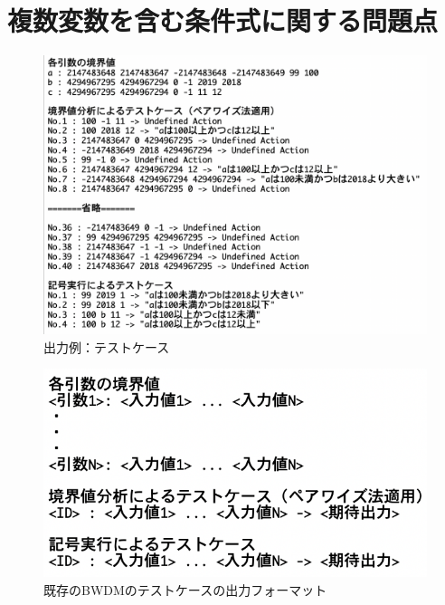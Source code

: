 \documentclass[uplatex, report, a4j, 10pt]{jsbook}
\begin{document}
\section{複数変数を含む条件式に関する問題点}
\begin{figure}[t]
  \begin{center}
    \includegraphics[keepaspectratio, width=160mm]{figs/sample_testcase.png}
    \caption{出力例：テストケース}
    \label{fig:testcase_sample}
  \end{center}
\end{figure}

\begin{figure}[t]
  \begin{center}
    \includegraphics[keepaspectratio, width=160mm]{figs/bwdm_format.png}
    \caption{既存のBWDMのテストケースの出力フォーマット}
    \label{fig:bwdm_format}
  \end{center}
\end{figure}
\end{document}
